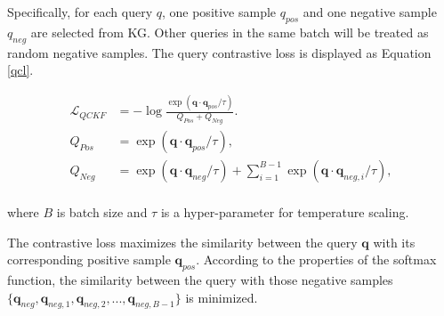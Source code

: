 

Specifically, for each query $q$, one positive sample $q_{pos}$ and one negative sample $q_{neg}$ are selected from KG. Other queries in the same batch will be treated as random negative samples. The query contrastive loss is displayed as Equation \ref{qcl}.



\begin{equation}
    \label{qcl}
    \begin{aligned}
    \mathcal{L}_{QCKF}&=-{\log\frac{\exp(\mathbf{q}\cdot\mathbf{q}_{pos}/\tau)}{Q_{Pos}+Q_{Neg}}}. \\
    Q_{Pos}&={\exp(\mathbf{q}\cdot\mathbf{q}_{pos}/\tau)}, \\
    Q_{Neg}&={\exp(\mathbf{q}\cdot\mathbf{q}_{neg}/\tau)} + \sum_{i=1}^{B-1}
    {\exp(\mathbf{q}\cdot\mathbf{q}_{neg, i}/\tau)},\\
    \end{aligned}
\end{equation}

\noindent where $B$ is batch size and $\tau$ is a hyper-parameter for temperature scaling.

The contrastive loss maximizes the similarity between the query $\mathbf{q}$ with its corresponding positive sample $\mathbf{q}_{pos}$. According to the properties of the softmax function, the similarity between the query with those negative samples $\{\mathbf{q}_{neg}, \mathbf{q}_{neg, 1}, \mathbf{q}_{neg, 2}, ..., \mathbf{q}_{neg, B-1}\}$ is minimized.


